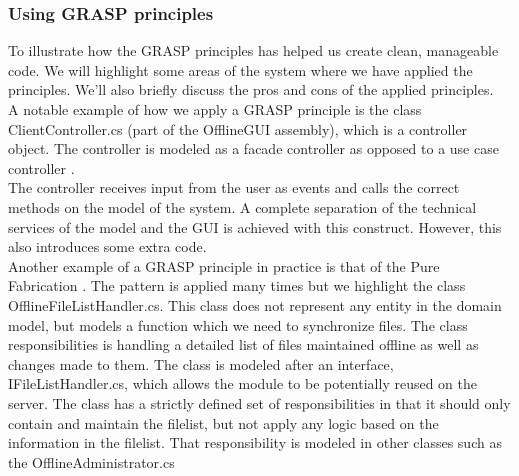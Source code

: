 \subsubsection{Using GRASP principles}
To illustrate how the GRASP principles has helped us create clean, manageable code. We will highlight some areas of the system where we have applied the principles. We'll also briefly discuss the pros and cons of the applied principles. \\
A notable example of how we apply a GRASP principle is the class ClientController.cs (part of the OfflineGUI assembly), which is a controller object. The controller is modeled as a facade controller as opposed to a use case controller \cite[p.~237]{OOAD}.\\
The controller receives input from the user as events and calls the correct methods on the model of the system. A complete separation of the technical services of the model and the GUI is achieved with this construct. However, this also introduces some extra code.\\
\newline
Another example of a GRASP principle in practice is that of the Pure Fabrication \cite[p.~330]{OOAD}. The pattern is applied many times but we highlight the class OfflineFileListHandler.cs. This class does not represent any entity in the domain model, but models a function which we need to synchronize files. The class responsibilities is handling a detailed list of files maintained offline as well as changes made to them. The class is modeled after an interface, IFileListHandler.cs, which allows the module to be potentially reused on the server. The class has a strictly defined  set of responsibilities in that it should only contain and maintain the filelist, but not apply any logic based on the information in the filelist. That responsibility is modeled in other classes such as the OfflineAdministrator.cs\\
